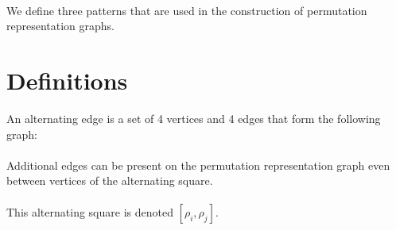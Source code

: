 \paragraph{}
We define three patterns that are used in the construction of permutation representation graphs.

\section{Definitions}
\begin{definition}
  An alternating edge is a set of 4 vertices and 4 edges that form the following graph:

  \begin{figure}[H]
    \begin{center}
      \caption{}
    \end{center}
  \end{figure}

  \paragraph{}
  Additional edges can be present on the permutation representation graph even between vertices of the alternating square.

  \paragraph{}
  This alternating square is denoted $[\rho_i, \rho_j]$.
\end{definition}

